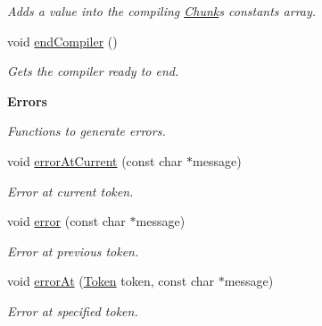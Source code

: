 \begin{Indent}
\begin{DoxyCompactItemize}
\begin{DoxyCompactList}\small\item\em Adds a value into the compiling \hyperlink{class_chunk}{Chunk}\textquotesingle{}s constants array. \end{DoxyCompactList}\item 
\mbox{\label{class_compiler_a6bd8ecde77333864430dcadd1f0538ca}} 
void \hyperlink{class_compiler_a6bd8ecde77333864430dcadd1f0538ca}{end\+Compiler} ()
\begin{DoxyCompactList}\small\item\em Gets the compiler ready to end. \end{DoxyCompactList}\end{DoxyCompactItemize}
\end{Indent}
\begin{Indent}\textbf{ Errors}\par
{\em Functions to generate errors. }\begin{DoxyCompactItemize}
\item 
void \hyperlink{class_compiler_a82a0fa92a3cd417321192dc92ff70e63}{error\+At\+Current} (const char $\ast$message)
\begin{DoxyCompactList}\small\item\em Error at current token. \end{DoxyCompactList}\item 
void \hyperlink{class_compiler_ab7a1badde3752ab4c9e756c9781cab12}{error} (const char $\ast$message)
\begin{DoxyCompactList}\small\item\em Error at previous token. \end{DoxyCompactList}\item 
\mbox{\label{class_compiler_a7385adf0dcc601e6d4668e535167758a}} 
void \hyperlink{class_compiler_a7385adf0dcc601e6d4668e535167758a}{error\+At} (\hyperlink{struct_token}{Token} token, const char $\ast$message)
\begin{DoxyCompactList}\small\item\em Error at specified token. \end{DoxyCompactList}\end{DoxyCompactItemize}
\end{Indent}
